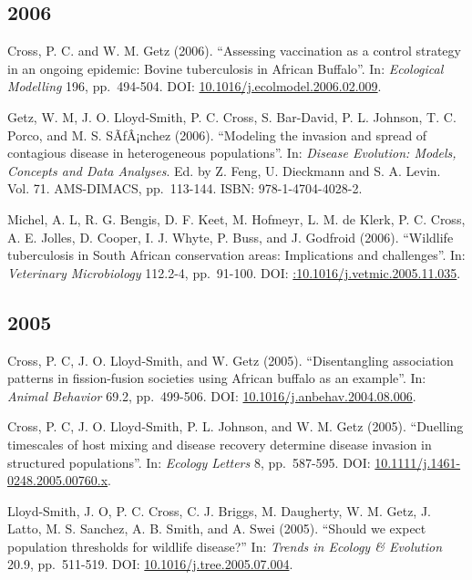 \documentclass[12pt,]{article}
\begin{document}
\hypertarget{section-13}{%
\subsection{2006}\label{section-13}}

Cross, P. C. and W. M. Getz (2006). ``Assessing vaccination as a control
strategy in an ongoing epidemic: Bovine tuberculosis in African
Buffalo''. In: \emph{Ecological Modelling} 196, pp.~494-504. DOI:
\href{https://doi.org/10.1016\%2Fj.ecolmodel.2006.02.009}{10.1016/j.ecolmodel.2006.02.009}.

Getz, W. M, J. O. Lloyd-Smith, P. C. Cross, S. Bar-David, P. L. Johnson,
T. C. Porco, and M. S. SÃƒÂ¡nchez (2006). ``Modeling the invasion and
spread of contagious disease in heterogeneous populations''. In:
\emph{Disease Evolution: Models, Concepts and Data Analyses}. Ed. by Z.
Feng, U. Dieckmann and S. A. Levin. Vol. 71. AMS-DIMACS, pp.~113-144.
ISBN: 978-1-4704-4028-2.

Michel, A. L, R. G. Bengis, D. F. Keet, M. Hofmeyr, L. M. de Klerk, P.
C. Cross, A. E. Jolles, D. Cooper, I. J. Whyte, P. Buss, and J. Godfroid
(2006). ``Wildlife tuberculosis in South African conservation areas:
Implications and challenges''. In: \emph{Veterinary Microbiology}
112.2-4, pp.~91-100. DOI:
\href{https://doi.org/\%3A10.1016\%2Fj.vetmic.2005.11.035}{:10.1016/j.vetmic.2005.11.035}.

\hypertarget{section-14}{%
\subsection{2005}\label{section-14}}

Cross, P. C, J. O. Lloyd-Smith, and W. Getz (2005). ``Disentangling
association patterns in fission-fusion societies using African buffalo
as an example''. In: \emph{Animal Behavior} 69.2, pp.~499-506. DOI:
\href{https://doi.org/10.1016\%2Fj.anbehav.2004.08.006}{10.1016/j.anbehav.2004.08.006}.

Cross, P. C, J. O. Lloyd-Smith, P. L. Johnson, and W. M. Getz (2005).
``Duelling timescales of host mixing and disease recovery determine
disease invasion in structured populations''. In: \emph{Ecology Letters}
8, pp.~587-595. DOI:
\href{https://doi.org/10.1111\%2Fj.1461-0248.2005.00760.x}{10.1111/j.1461-0248.2005.00760.x}.

Lloyd-Smith, J. O, P. C. Cross, C. J. Briggs, M. Daugherty, W. M. Getz,
J. Latto, M. S. Sanchez, A. B. Smith, and A. Swei (2005). ``Should we
expect population thresholds for wildlife disease?'' In: \emph{Trends in
Ecology \& Evolution} 20.9, pp.~511-519. DOI:
\href{https://doi.org/10.1016\%2Fj.tree.2005.07.004}{10.1016/j.tree.2005.07.004}.
\end{document}
